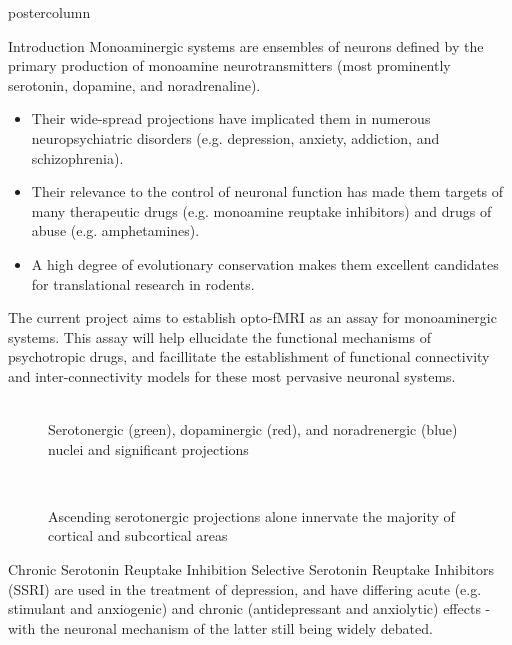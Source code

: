 \documentclass{beamer}
\begin{document}
\begin{frame}
\begin{columns}
\begin{column}{.43\textwidth}
\begin{beamercolorbox}[center]{postercolumn}
\begin{minipage}{.98\textwidth}
{\begin{myblock}{Introduction}
						Monoaminergic systems are ensembles of neurons defined by the primary production of monoamine neurotransmitters (most prominently serotonin, dopamine, and noradrenaline).
						\begin{itemize}
							\item Their wide-spread projections have implicated them in numerous neuropsychiatric disorders (e.g. depression, anxiety, addiction, and schizophrenia).
							\item Their relevance to the control of neuronal function has made them targets of many therapeutic drugs (e.g. monoamine reuptake inhibitors) and drugs of abuse (e.g. amphetamines).
							\item A high degree of evolutionary conservation makes them excellent candidates for translational research in rodents.
						\end{itemize}
						The current project aims to establish opto-fMRI as an assay for monoaminergic systems.
						This assay will help ellucidate the functional mechanisms of psychotropic drugs, and facillitate the establishment of functional connectivity and inter-connectivity models for these most pervasive neuronal systems.
						\vspace{0.4em}
						\begin{figure}
							\begin{minipage}{0.43\textwidth}
								\centering%
\\%
								\caption{Serotonergic (green), dopaminergic (red), and noradrenergic (blue) nuclei and significant projections \cite{Paivi}}
							\end{minipage}
							\hspace{1em}
							\begin{minipage}{0.45\textwidth}
\centering%
\\%
								\caption{Ascending serotonergic projections alone innervate the majority of cortical and subcortical areas \cite{Oegren2008}}
							\end{minipage}
						\end{figure}
					\end{myblock}\vfill
					\begin{myblock}{Chronic Serotonin Reuptake Inhibition}
						Selective Serotonin Reuptake Inhibitors (SSRI) are used in the treatment of depression, and have differing acute (e.g. stimulant and anxiogenic) and chronic (antidepressant and anxiolytic) effects - with the neuronal mechanism of the latter still being widely debated.

\end{myblock}}
\end{minipage}
\end{beamercolorbox}
\end{column}
\end{columns}
\end{frame}
\end{document}
